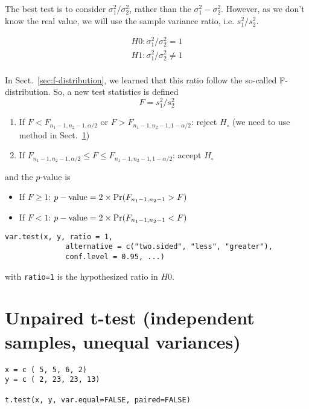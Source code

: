 The best test is to consider $\sigma_1^2/\sigma_2^2$, rather than the
$\sigma_1^2-\sigma_2^2$. However, as we don't know the real value, we
will use the sample variance ratio, i.e. $s_1^2/s_2^2$. 

\begin{eqnarray*}
  H0: \sigma_1^2 /\sigma_2^2 = 1 \\
  H1: \sigma_1^2 / \sigma_2^2 \ne 1\\
\end{eqnarray*}

In Sect.~\ref{sec:f-distribution}, we learned that this ratio follow
the so-called F-distribution. So, a new test statistics is defined
\begin{equation}
  \label{eq:86}
  F = s_1^2/s_2^2
\end{equation}
\begin{enumerate}
\item If $F< F_{n_1-1, n_2-1, \alpha/2}$ or $F >
  F_{n_1-1, n_2-1, 1-\alpha/2}$: reject $H_\circ$ (we need to use
  method in Sect.~\ref{sec:unpaired-t-test-1})
\item If $F_{n_1-1, n_2-1, \alpha/2} \le F \le
  F_{n_1-1, n_2-1, 1-\alpha/2}$: accept $H_\circ$
\end{enumerate}
and the $p$-value is
\begin{itemize}
\item If $F \ge 1$: $p-\text{value} = 2\times \text{Pr}(F_{n_1-1,n_2-1} > F)$
\item If $F < 1$: $p-\text{value} = 2\times \text{Pr}(F_{n_1-1,n_2-1} < F)$
\end{itemize}

\begin{lstlisting}
var.test(x, y, ratio = 1,
              alternative = c("two.sided", "less", "greater"),
              conf.level = 0.95, ...)
\end{lstlisting}
with \verb!ratio=1! is the hypothesized ratio in $H0$. 

\section[Satterthwaite's Method]{Unpaired t-test (independent samples,
  unequal variances)}
\label{sec:unpaired-t-test-1}

\begin{lstlisting}
x = c ( 5, 5, 6, 2)
y = c ( 2, 23, 23, 13)

t.test(x, y, var.equal=FALSE, paired=FALSE)
\end{lstlisting}

